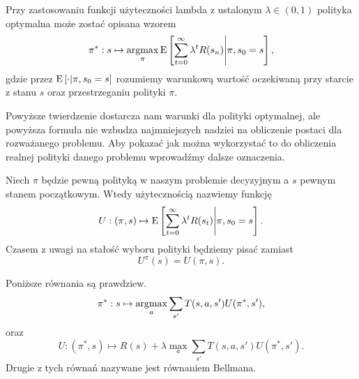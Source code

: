 \documentclass[10pt,a4paper]{book}
\newcommand{\argmax}{\operatornamewithlimits{argmax}}
\begin{document}
\begin{theorem}
Przy zastosowaniu funkcji użyteczności lambda z ustalonym $\lambda \in (0,1)$ polityka optymalna może zostać opisana wzorem
$$
\pi^\ast : s \mapsto \argmax_{\pi} \ExConditional{\sum_{t=0}^{\infty} \lambda^t R(s_n) }{ \pi, s_0 = s},
$$
gdzie przez $\operatorname{E} \left[ {\cdot} \middle| {\pi, s_0 = s} \right]$ rozumiemy warunkową wartość oczekiwaną przy starcie z stanu $s$ oraz przestrzeganiu polityki $\pi$.
\end{theorem}

Powyższe twierdzenie dostarcza nam warunki dla polityki optymalnej, ale powyższa formuła nie wzbudza najmniejszych nadziei na obliczenie postaci dla rozważanego problemu. Aby pokazać jak można wykorzystać to do obliczenia realnej polityki danego problemu wprowadźmy dalsze oznaczenia.

\begin{definition}
Niech $\pi$ będzie pewną polityką w naszym problemie decyzyjnym a $s$ pewnym stanem początkowym. Wtedy użytecznością nazwiemy funkcję 
$$
U : (\pi, s) \mapsto \ExConditional{\sum_{t=0}^{\infty} \lambda^t R(s_t) }{ \pi, s_0 = s}.
$$
Czasem z uwagi na stałość wyboru polityki będziemy pisać zamiast
$$
U^\pi(s) = U(\pi, s).
$$
\end{definition}

\begin{theorem}
Poniższe równania są prawdziew.
$$
\pi^\ast : s \mapsto \argmax_{a} \sum_{s'} T(s,a,s') U(\pi^\ast, s'),
$$
oraz
$$
U: (\pi^\ast, s) \mapsto R(s) + \lambda \max_{a} \sum_{s'} T(s,a,s') U(\pi^\ast, s').
$$
Drugie z tych równań nazywane jest równaniem Bellmana. 
\end{theorem}
\end{document}
